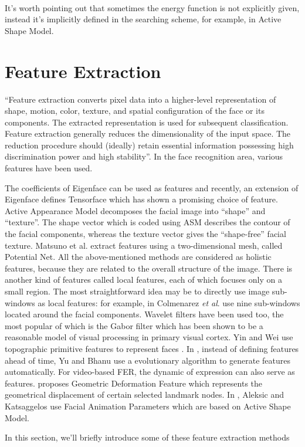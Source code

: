 \documentclass[12pt]{report}
\begin{document}
\paragraph{}
It’s worth pointing out that sometimes the energy function is not explicitly given, instead it’s implicitly defined in the searching scheme, for example, in Active Shape Model.

\section{Feature Extraction}
“Feature extraction converts pixel data into a higher-level representation of shape, motion, color, texture, and spatial configuration of the face or its components. The extracted representation is used for subsequent classification. Feature extraction generally reduces the dimensionality of the input space. The reduction procedure should (ideally) retain essential information possessing high discrimination power and high stability”. In the face recognition area, various features have been used.

The coefficients of Eigenface can be used as features and recently, an extension of Eigenface defines Tensorface which has shown a promising choice of feature. Active Appearance Model  decomposes the facial image into “shape” and “texture”. The shape vector which is coded using ASM describes the contour of the facial components, whereas
the texture vector gives the “shape-free” facial texture. Matsuno et al.  extract features using a two-dimensional mesh, called Potential Net. All the above-mentioned methods are considered as holistic features, because they are related to the overall structure of the image. There is another kind of features called local features, each of which focuses only on a small region. The most straightforward idea may be to directly use image sub-windows as local features: for example, in \cite{15} Colmenarez \textit{ et al}. use nine sub-windows located around the facial components. Wavelet filters have been used too, the most popular of which is the Gabor filter which has been shown \cite{22} \cite{37} to be a reasonable model of visual processing in primary visual cortex. Yin and Wei use topographic primitive features to represent faces \cite{103}. In \cite{104}, instead of defining features ahead of time, Yu and Bhanu use a evolutionary algorithm to generate features automatically. For video-based FER, the dynamic of expression can also serve as features. \cite{44} proposes Geometric Deformation Feature which represents the geometrical displacement of certain selected landmark nodes. In \cite{1}, Aleksic and Katsaggelos use Facial Animation Parameters which are based on Active Shape Model.
\par In this section, we'll briefly introduce some of these feature extraction methods
\par
\end{document}
